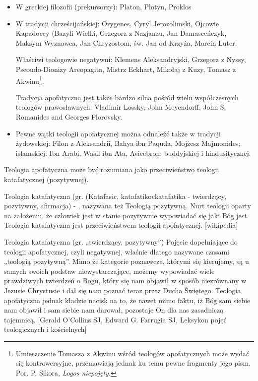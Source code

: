 \begin{itemize}
  \item W greckiej filozofii (prekursorzy): Platon, Plotyn, Proklos
  \item W tradycji chrześcijańskiej: Orygenes, Cyryl Jerozolimski, Ojcowie
Kapadoccy (Bazyli Wielki, Grzegorz z Nazjanzu, Jan Damasceńczyk, Maksym
Wyznawca, Jan Chryzostom, św. Jan od Krzyża, Marcin Luter.

Właściwi teologowie negatywni: Klemens Aleksandryjski, Grzegorz z Nyssy,
Pseoudo-Dionizy Areopagita, Mistrz Eckhart, Mikołaj z Kuzy, Tomasz z
Akwinu\footnote{Umieszczenie Tomasza z Akwinu wśród teologów
apofatycznych może wydać się kontrowersyjne, przemawiają jednak ku temu
pewne fragmenty jego pism. Por. P. Sikora, \textit{Logos
niepojęty.} }.

Tradycja apofatyczna jest także bardzo silna pośród wielu współczesnych
teologów prawosławnych: Vladimir Lossky, John Meyendorff, John S.
Romanides and Georges Florovsky.
  \item Pewne wątki teologii apofatycznej można odnaleźć także w tradycji
żydowskiej: Filon z Aleksandrii, Bahya ibn Paquda, Mojżesz Majmonides;
islamskiej: Ibn Arabi, Wasil ibn Ata, Avicebron; buddyjskiej i
hindusitycznej.
\end{itemize}

Teologia apofatyczna może być rozumiana jako przeciwieństwo teologii
katafatycznej (pozytywnej).


\begin{defin}
Teologia katafatyczna (gr. (\textgreek{Katafasic, katafatikoc}katafatika
- twierdzący, pozytywny, afirmacja) - , nazywana też Teologią
pozytywną. Nurt teologii oparty na założeniu, że człowiek jest w stanie
pozytywnie wypowiadać się {\textquotedbl}jaki Bóg jest{\textquotedbl}.
Teologia katafatyczna jest przeciwieństwem teologii apofatycznej.
[wikipedia]
\end{defin}


\begin{defin}
Teologia katafatyczna (gr. „twierdzący, pozytywny”) Pojęcie dopełniające
do teologii apofatycznej, czyli negatywnej, właśnie dlatego nazywane
czasami „teologią pozytywną”. Mimo że kategorie poznawcze, którymi się
kierujemy, są u samych swoich podstaw niewystarczające, możemy
wypowiadać wiele prawdziwych twierdzeń o Bogu, który się nam objawił w
sposób niezrównany w Jezusie Chrystusie i dał się nam poznać teraz
przez Ducha Świętego. Teologia apofatyczna jednak kładzie nacisk na to,
że nawet mimo faktu, iż Bóg sam siebie nam objawił i sam siebie nam
darował, pozostaje On dla nas zasadniczą tajemnicą. [Gerald
O'Collins SJ, Edward G. Farrugia SJ, Leksykon pojęć
teologicznych i kościelnych]
\end{defin}

